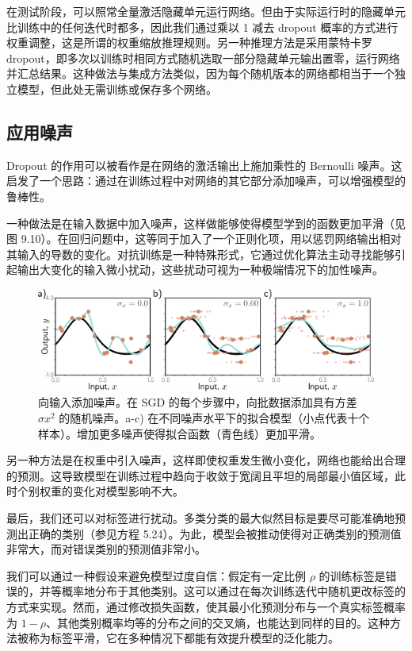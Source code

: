 在测试阶段，可以照常全量激活隐藏单元运行网络。但由于实际运行时的隐藏单元比训练中的任何迭代时都多，因此我们通过乘以 1 减去 dropout 概率的方式进行权重调整，这是所谓的权重缩放推理规则。另一种推理方法是采用蒙特卡罗 dropout，即多次以训练时相同方式随机选取一部分隐藏单元输出置零，运行网络并汇总结果。这种做法与集成方法类似，因为每个随机版本的网络都相当于一个独立模型，但此处无需训练或保存多个网络。
\subsection{应用噪声}
Dropout 的作用可以被看作是在网络的激活输出上施加乘性的 Bernoulli 噪声。这启发了一个思路：通过在训练过程中对网络的其它部分添加噪声，可以增强模型的鲁棒性。

一种做法是在输入数据中加入噪声，这样做能够使得模型学到的函数更加平滑（见图 9.10）。在回归问题中，这等同于加入了一个正则化项，用以惩罚网络输出相对其输入的导数的变化。对抗训练是一种特殊形式，它通过优化算法主动寻找能够引起输出大变化的输入微小扰动，这些扰动可视为一种极端情况下的加性噪声。

\begin{figure}[ht!]
	\centering
	\includegraphics[width=0.7\linewidth]{png/chapter9/RegNoise.png}
	\caption{向输入添加噪声。在 SGD 的每个步骤中，向批数据添加具有方差 \(\sigma x^2\) 的随机噪声。a-c) 在不同噪声水平下的拟合模型（小点代表十个样本）。增加更多噪声使得拟合函数（青色线）更加平滑。}
\end{figure}


另一种方法是在权重中引入噪声，这样即使权重发生微小变化，网络也能给出合理的预测。这导致模型在训练过程中趋向于收敛于宽阔且平坦的局部最小值区域，此时个别权重的变化对模型影响不大。

最后，我们还可以对标签进行扰动。多类分类的最大似然目标是要尽可能准确地预测出正确的类别（参见方程 5.24）。为此，模型会被推动使得对正确类别的预测值非常大，而对错误类别的预测值非常小。

我们可以通过一种假设来避免模型过度自信：假定有一定比例 \(\rho\) 的训练标签是错误的，并等概率地分布于其他类别。这可以通过在每次训练迭代中随机更改标签的方式来实现。然而，通过修改损失函数，使其最小化预测分布与一个真实标签概率为 \(1 − \rho\)、其他类别概率均等的分布之间的交叉熵，也能达到同样的目的。这种方法被称为标签平滑，它在多种情况下都能有效提升模型的泛化能力。

